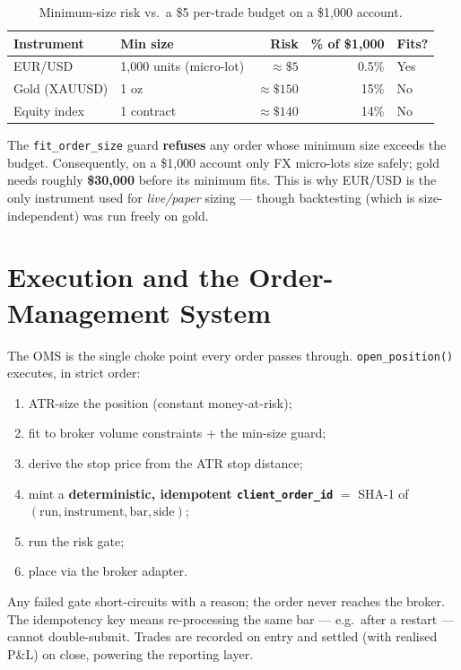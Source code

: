 \documentclass[11pt,a4paper]{article}
\newcommand{\tbot}[1]{\texttt{#1}}
\begin{document}
\begin{table}[ht]\centering
\caption{Minimum-size risk vs.\ a \$5 per-trade budget on a \$1{,}000 account.}
\begin{tabular}{@{}llrrl@{}}
\toprule
\textbf{Instrument} & \textbf{Min size} & \textbf{Risk} & \textbf{\% of \$1{,}000} & \textbf{Fits?} \\
\midrule
EUR/USD & 1{,}000 units (micro-lot) & $\approx\$5$ & 0.5\% & Yes \\
Gold (XAUUSD) & 1 oz & $\approx\$150$ & 15\% & No \\
Equity index & 1 contract & $\approx\$140$ & 14\% & No \\
\bottomrule
\end{tabular}
\end{table}

\noindent The \tbot{fit\_order\_size} guard \textbf{refuses} any order whose minimum size exceeds the budget. Consequently, on a \$1{,}000 account only FX micro-lots size safely; gold needs roughly \textbf{\$30{,}000} before its minimum fits. This is why EUR/USD is the only instrument used for \emph{live/paper} sizing --- though backtesting (which is size-independent) was run freely on gold.

\section{Execution and the Order-Management System}\label{sec:oms}
The OMS is the single choke point every order passes through. \tbot{open\_position()} executes, in strict order:
\begin{enumerate}[leftmargin=1.6em,itemsep=0pt]
  \item ATR-size the position (constant money-at-risk);
  \item fit to broker volume constraints $+$ the min-size guard;
  \item derive the stop price from the ATR stop distance;
  \item mint a \textbf{deterministic, idempotent \tbot{client\_order\_id}} $=$ SHA-1 of $(\text{run}, \text{instrument}, \text{bar}, \text{side})$;
  \item run the risk gate;
  \item place via the broker adapter.
\end{enumerate}
Any failed gate short-circuits with a reason; the order never reaches the broker. The idempotency key means re-processing the same bar --- e.g.\ after a restart --- cannot double-submit. Trades are recorded on entry and settled (with realised P\&L) on close, powering the reporting layer.
\end{document}
